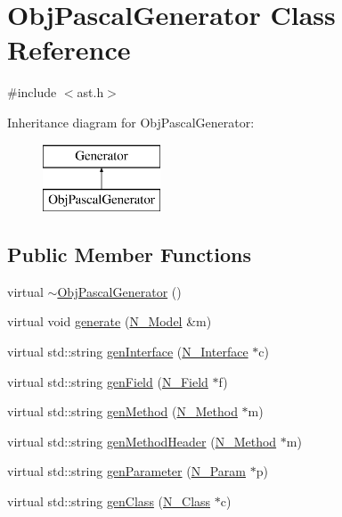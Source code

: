 \hypertarget{classObjPascalGenerator}{}\section{Obj\+Pascal\+Generator Class Reference}
\label{classObjPascalGenerator}


{\ttfamily \#include $<$ast.\+h$>$}

Inheritance diagram for Obj\+Pascal\+Generator\+:\begin{figure}[H]
\begin{center}
\leavevmode
\includegraphics[height=2.000000cm]{classObjPascalGenerator}
\end{center}
\end{figure}
\subsection*{Public Member Functions}
\begin{DoxyCompactItemize}
\item 
virtual \hyperlink{classObjPascalGenerator_a83c889dac4b29dc7979fbf06fc0fe06a}{$\sim$\+Obj\+Pascal\+Generator} ()
\item 
virtual void \hyperlink{classObjPascalGenerator_a8129a8aab5c9b1f8dab3bb3c4de460d0}{generate} (\hyperlink{classN__Model}{N\+\_\+\+Model} \&m)
\item 
virtual std\+::string \hyperlink{classObjPascalGenerator_a833b2caffb9da2595a9f447bc6264ecf}{gen\+Interface} (\hyperlink{classN__Interface}{N\+\_\+\+Interface} $\ast$c)
\item 
virtual std\+::string \hyperlink{classObjPascalGenerator_a0bb3fad2c4df2a741c96d37d1e2d4449}{gen\+Field} (\hyperlink{classN__Field}{N\+\_\+\+Field} $\ast$f)
\item 
virtual std\+::string \hyperlink{classObjPascalGenerator_a4fa9c56ef03cc1999ce178fabedebb60}{gen\+Method} (\hyperlink{classN__Method}{N\+\_\+\+Method} $\ast$m)
\item 
virtual std\+::string \hyperlink{classObjPascalGenerator_a1c6095fef516716336de164da25da1e2}{gen\+Method\+Header} (\hyperlink{classN__Method}{N\+\_\+\+Method} $\ast$m)
\item 
virtual std\+::string \hyperlink{classObjPascalGenerator_a1f6ec48b26e0a002816737220a6eb26d}{gen\+Parameter} (\hyperlink{classN__Param}{N\+\_\+\+Param} $\ast$p)
\item 
virtual std\+::string \hyperlink{classObjPascalGenerator_a690ce15adcc6d94fc994737f1acdfac7}{gen\+Class} (\hyperlink{classN__Class}{N\+\_\+\+Class} $\ast$c)
\end{DoxyCompactItemize}
